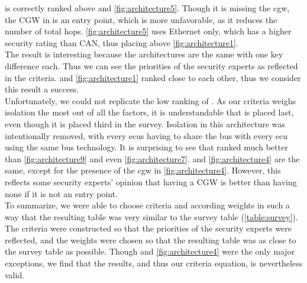  is correctly ranked above  and \ref{fig:architecture5}.
Though it is missing the \acrshort{cgw}, the CGW in  is an entry point, which is more unfavorable, as it reduces the number of total hops.
\ref{fig:architecture5} uses Ethernet only, which has a higher security rating than CAN, thus placing above \ref{fig:architecture1}.\\
The result is interesting because the architectures are the same with one key difference each. Thus we can see the priorities of the security experts
as reflected in the criteria.
 and \ref{fig:architecture1} ranked close to each other, thus we consider this result a success.\\

Unfortunately, we could not replicate the low ranking of .
As our criteria weighs isolation the most out of all the factors, it is understandable that  is placed last,
even though it is placed third in the survey.
Isolation in this architecture was intentionally removed, with every \acrshort{ecu}s having to share the bus with every \acrshort{ecu} using the same bus technology.
It is surprising to see that  ranked much better than \ref{fig:architecture9} and even \ref{fig:architecture7}.
 and \ref{fig:architecture4} are the same, except for the presence of the \acrshort{cgw} in \ref{fig:architecture4}.
However, this reflects some security experts' opinion that having a CGW is better than having none if it is not an entry point.\\

To summarize, we were able to choose criteria and according weights in such a way that the resulting table 
was very similar to the survey table (\ref{table:survey}).
The criteria were constructed so that the priorities of the security experts were reflected, 
and the weights were chosen so that the resulting table was as close to the survey table as possible.
Though  and \ref{fig:architecture4} were the only major exceptions, 
we find that the results, and thus our criteria equation, is nevertheless valid.\\

